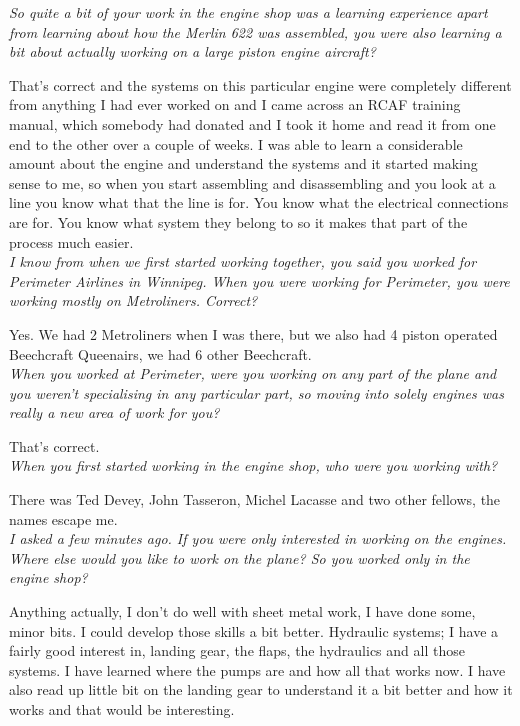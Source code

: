 \noindent\textit{So quite a bit of your work in the engine shop was a learning
experience apart from learning about how the Merlin 622 was assembled, you were
also learning a bit about actually working on a large piston engine aircraft?}

That's correct and the systems on this particular engine were completely
different from anything I had ever worked on and I came across  an RCAF training
manual, which somebody had donated and I took it home and read it from one end
to the other over a couple of weeks. I was able to learn a considerable amount
about the engine and understand the systems and it started making sense to me,
so when you start assembling and disassembling and you look at a line you know
what that the line is for. You know what the electrical connections are for. You
know what system they belong to so it makes that part of the process much
easier.\\

\noindent\textit{I know from when we first started working together, you said
you worked for Perimeter Airlines in Winnipeg.  When you were working for
Perimeter, you were working mostly on Metroliners. Correct?}

Yes.  We had 2 Metroliners when I was there, but we also had 4 piston operated
Beechcraft Queenairs, we had 6 other Beechcraft.\\

\noindent\textit{When you worked at Perimeter, were you working on any part of
the plane and you weren't specialising in any particular part, so moving into
solely engines was really a new area of work for you?}

That's correct.\\

\noindent\textit{When you first started working in the engine shop, who were you
working with?}

There was Ted Devey, John Tasseron, Michel Lacasse and two other
fellows, the names escape me.\\

\noindent\textit{I asked a few minutes ago.  If you were only interested in
working on the engines.  Where else would you like to work on the plane? So you worked only in the engine shop?}

Anything actually, I don't do well with sheet metal work, I have done some,
minor bits. I could develop those skills a bit better.  Hydraulic systems; I
have a fairly good interest in, landing gear, the flaps, the hydraulics and all
those systems.  I have learned where the pumps are and how all that works now.
I have also read up little bit on the landing gear to understand it a bit better
and how it works and that would be interesting.\\

